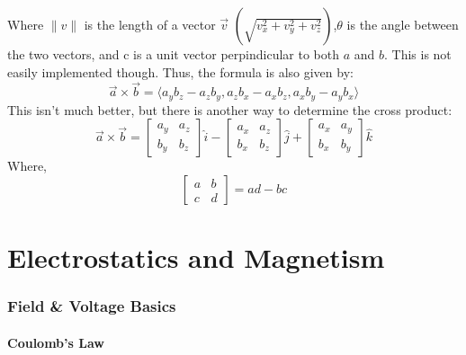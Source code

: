 \documentclass[a4paper,12pt]{article}
\begin{document}
								Where $\|v\|$ is the length of a vector $\vec{v}$  $\left( \sqrt{v_{x}^{2} + v_{y}^{2} + v_{z}^{2}}\right)$,$\theta$ is the angle between the two vectors, and c is a unit vector perpindicular to both $a$ and $b$. This is not easily implemented though. Thus, the formula is also given by:
								\begin{equation*}
										\vec{a} \times \vec{b} = \langle a_{y}b_{z} - a_{z}b_{y}, a_{z}b_{x} - a_{x}b_{z}, a_{x}b_{y}-a_{y}b_{x}\rangle
								\end{equation*}
								This isn't much better, but there is another way to determine the cross product:
								\begin{equation*}
										\vec{a} \times \vec{b} = \begin{bmatrix}
												a_{y} & a_{z} \\
												b_{y} & b_{z} 
										\end{bmatrix}\hat{i} - \begin{bmatrix}
												a_{x} & a_{z} \\
												b_{x}& b_{z} 
										\end{bmatrix}\hat{j} + \begin{bmatrix}
												a_{x} & a_{y} \\
												b_{x}& b_{y} 
										\end{bmatrix}\hat{k} 
								\end{equation*}
								Where,
								\begin{equation*}
										\begin{bmatrix}
												a & b \\
												c & d
										\end{bmatrix} = ad-bc
								\end{equation*}
		\newpage
\setcounter{section}{0}
\setcounter{subsection}{0}
\setcounter{subsubsection}{0}
\part{Electrostatics and Magnetism}

		\section{Field \& Voltage Basics}
				\subsection{Coulomb's Law}
\end{document}
